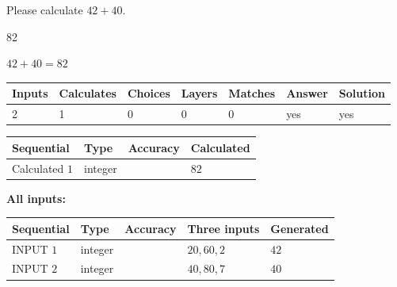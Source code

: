 \documentclass[12pt]{article}
\begin{document}
  
 
Please calculate $ %
42 +  %
40 $.
 
 
 
\noindent{}
 
 

82
 
 
\noindent{}
 
 

 
 
 
\noindent{}
 
 

$ %
42 +  %
40=   %
82$
 
 
\noindent{}
 
 

 
   
   
   
   
\noindent\begin{tabular}{|l|l|l|l|l|l|l|}
 \hline
Inputs & Calculates & Choices & Layers & Matches & Answer & Solution \\ \hline
 2  & 
 1  & 
 0
  & 
 0  & 
 0  & 
  yes & 
  yes 
  \\ \hline
 \end{tabular}
   
   
   
   
\noindent{}
   
   
  
  
\noindent\begin{tabular}{|l|l|l|l|}
\hline
 Sequential & Type & Accuracy & Calculated \\ 
\hline
 
 
  Calculated $  1 $ & integer &  & 
  $ 82 $ 
 \\  \hline  
 \end{tabular}
   
   
   
   
\noindent\vspace{0.1in}\hspace{-0.08in} {\textbf{\Large{All inputs: }}}
   
   
  
  
\noindent\begin{tabular}{|l|l|l|l|l|}
\hline
 Sequential & Type & Accuracy & Three inputs & Generated \\ 
\hline
 
 
  INPUT $  1 $ & integer &  & $
 20
 , 
 60
 , 
 2
 $ & $ 42 $ 
 \\  \hline  
 
 
  INPUT $  2 $ & integer &  & $
 40
 , 
 80
 , 
 7
 $ & $ 40 $ 
 \\  \hline  
 \end{tabular}
   
\end{document}
